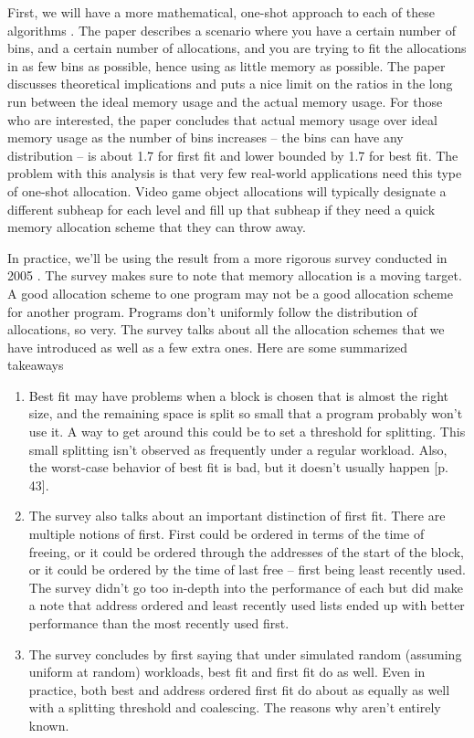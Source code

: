 First, we will have a more mathematical, one-shot approach to each of these algorithms \cite{Garey:1972:WAM:800152.804907}. The paper describes a scenario where you have a certain number of bins, and a certain number of allocations, and you are trying to fit the allocations in as few bins as possible, hence using as little memory as possible.
The paper discusses theoretical implications and puts a nice limit on the ratios in the long run between the ideal memory usage and the actual memory usage.
For those who are interested, the paper concludes that actual memory usage over ideal memory usage as the number of bins increases -- the bins can have any distribution -- is about 1.7 for first fit and lower bounded by 1.7 for best fit.
The problem with this analysis is that very few real-world applications need this type of one-shot allocation.
Video game object allocations will typically designate a different subheap for each level and fill up that subheap if they need a quick memory allocation scheme that they can throw away.

In practice, we'll be using the result from a more rigorous survey conducted in 2005 \cite{10.1007/3-540-60368-9_19}.
The survey makes sure to note that memory allocation is a moving target.
A good allocation scheme to one program may not be a good allocation scheme for another program.
Programs don't uniformly follow the distribution of allocations, so very.
The survey talks about all the allocation schemes that we have introduced as well as a few extra ones.
Here are some summarized takeaways

\begin{enumerate}
\item Best fit may have problems when a block is chosen that is almost the right size, and the remaining space is split so small that a program probably won't use it.
  A way to get around this could be to set a threshold for splitting.
  This small splitting isn't observed as frequently under a regular workload.
  Also, the worst-case behavior of best fit is bad, but it doesn't usually happen [p. 43].
\item The survey also talks about an important distinction of first fit.
  There are multiple notions of first.
  First could be ordered in terms of the time of freeing, or it could be ordered through the addresses of the start of the block, or it could be ordered by the time of last free -- first being least recently used.
  The survey didn't go too in-depth into the performance of each but did make a note that address ordered and least recently used lists ended up with better performance than the most recently used first.
\item The survey concludes by first saying that under simulated random (assuming uniform at random) workloads, best fit and first fit do as well. Even in practice, both best and address ordered first fit do about as equally as well with a splitting threshold and coalescing. The reasons why aren't entirely known.
\end{enumerate}

